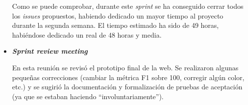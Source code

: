 \begin{itemize}
	Como se puede comprobar, durante este \textit{sprint} se ha conseguido cerrar todos los \textit{issues} propuestos, habiendo dedicado un mayor tiempo al proyecto durante la segunda semana. El tiempo estimado ha sido de 49 horas, habiéndose dedicado un real de 48 horas y media.
	
	\item \textbf{\textit{Sprint review meeting}}
	
	En esta reunión se revisó el prototipo final de la web. Se realizaron algunas pequeñas correcciones (cambiar la métrica F1 sobre 100, corregir algún color, etc.) y se sugirió la documentación y formalización de pruebas de aceptación (ya que se estaban haciendo “involuntariamente”).
	
\end{itemize}


